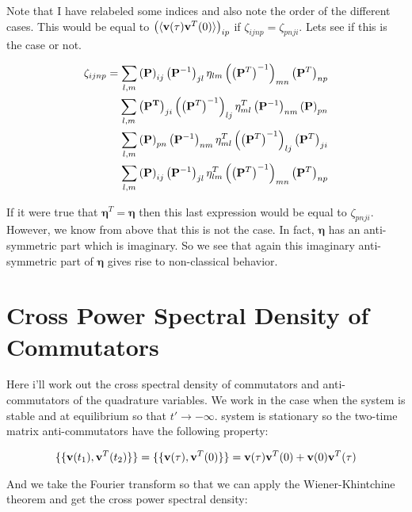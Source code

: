 \documentclass[12pt]{article}
\newcommand{\bv}[1]{\bold{#1}}
\begin{document}
Note that I have relabeled some indices and also note the order of the different cases. This would be equal to $\left(\braket{\bv{v}(\tau)\bv{v}^T(0)}\right)_{ip}$ if $\zeta_{ijnp} = \zeta_{pnji}$. Lets see if this is the case or not.

\begin{align}
\zeta_{ijnp} = \sum_{l,m} \left(\bv{P}\right)_{ij}\left(\bv{P}^{-1}\right)_{jl}\eta_{lm} \left(\left(\bv{P}^T\right)^{-1}\right)_{mn}\left(\bv{P}^{T}\right)_{np}\\
\sum_{l,m} \left(\bv{P^T}\right)_{ji}\left(\left(\bv{P}^T\right)^{-1}\right)_{lj}\eta^T_{ml} \left(\bv{P}^{-1}\right)_{nm}\left(\bv{P}\right)_{pn}\\
\sum_{l,m} \left(\bv{P}\right)_{pn}\left(\bv{P}^{-1}\right)_{nm}\eta^T_{ml} \left(\left(\bv{P}^T\right)^{-1}\right)_{lj}\left(\bv{P}^{T}\right)_{ji}\\
\sum_{l,m} \left(\bv{P}\right)_{ij}\left(\bv{P}^{-1}\right)_{jl}\eta^T_{lm} \left(\left(\bv{P}^T\right)^{-1}\right)_{mn}\left(\bv{P}^{T}\right)_{np}\\
\end{align}

If it were true that $\boldsymbol{\eta}^T = \boldsymbol{\eta}$ then this last expression would be equal to $\zeta_{pnji}$. However, we know from above that this is not the case. In fact, $\boldsymbol{\eta}$ has an anti-symmetric part which is imaginary. So we see that again this imaginary anti-symmetric part of $\boldsymbol{\eta}$ gives rise to non-classical behavior.

\section{Cross Power Spectral Density of Commutators}

Here i'll work out the cross spectral density of commutators and anti-commutators of the quadrature variables. We work in the case when the system is stable and at equilibrium so that $t'\rightarrow-\infty$. system is stationary so the two-time matrix anti-commutators have the following property:

\begin{align}
\{\{\bv{v}(t_1),\bv{v}^T(t_2)\}\} = \{\{\bv{v}(\tau),\bv{v}^T(0)\}\} = \bv{v}(\tau)\bv{v}^T(0) + \bv{v}(0)\bv{v}^T(\tau)
\end{align}

And we take the Fourier transform so that we can apply the Wiener-Khintchine theorem and get the cross power spectral density:
\end{document}
